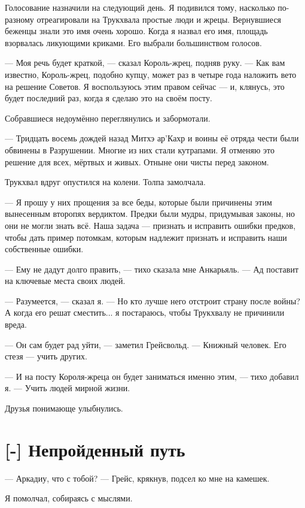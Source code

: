 Голосование назначили на следующий день.
Я подивился тому, насколько по-разному отреагировали на Трукхвала простые люди и жрецы.
Вернувшиеся беженцы знали это имя очень хорошо.
Когда я назвал его имя, площадь взорвалась ликующими криками.
Его выбрали большинством голосов.

--- Моя речь будет краткой, --- сказал Король-жрец, подняв руку.
--- Как вам известно, Король-жрец, подобно купцу, может раз в четыре года наложить вето на решение Советов.
Я воспользуюсь этим правом сейчас --- и, клянусь, это будет последний раз, когда я сделаю это на своём посту.

Собравшиеся недоумённо переглянулись и забормотали.

--- Тридцать восемь дождей назад Митхэ ар'Кахр и воины её отряда чести были обвинены в Разрушении.
Многие из них стали кутрапами.
Я отменяю это решение для всех, мёртвых и живых.
Отныне они чисты перед законом.

Трукхвал вдруг опустился на колени.
Толпа замолчала.

--- Я прошу у них прощения за все беды, которые были причинены этим вынесенным второпях вердиктом.
Предки были мудры, придумывая законы, но они не могли знать всё.
Наша задача --- признать и исправить ошибки предков, чтобы дать пример потомкам, которым надлежит признать и исправить наши собственные ошибки.

--- Ему не дадут долго править, --- тихо сказала мне Анкарьяль.
--- Ад поставит на ключевые места своих людей.

--- Разумеется, --- сказал я.
--- Но кто лучше него отстроит страну после войны?
А когда его решат сместить... я постараюсь, чтобы Трукхвалу не причинили вреда.

--- Он сам будет рад уйти, --- заметил Грейсвольд.
--- Книжный человек.
Его стезя --- учить других.

--- И на посту Короля-жреца он будет заниматься именно этим, --- тихо добавил я.
--- Учить людей мирной жизни.

Друзья понимающе улыбнулись.

\section{[-] Непройденный путь}

\textspace

--- Аркадиу, что с тобой? --- Грейс, крякнув, подсел ко мне на камешек.

Я помолчал, собираясь с мыслями.

